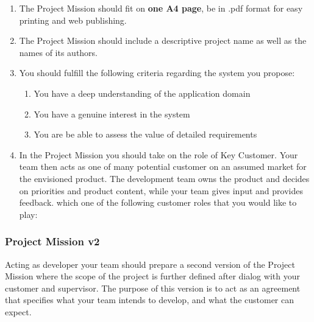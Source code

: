 \documentclass[10pt,a4paper]{article}
\begin{document}
 \begin{enumerate}[noitemsep]
 \item The Project Mission should fit on {\bf one A4 page}, be in .pdf format for easy printing and web publishing. 
 \item The Project Mission should include a descriptive project name as well as the names of its authors.


\item You should fulfill the following criteria regarding the system you propose:
\begin{enumerate}
\item You have a deep understanding of the application domain 
\item You have a genuine interest in the system 
\item You are be able to assess the value of detailed requirements 
\end{enumerate}
\item In the Project Mission you should take on the role of Key Customer. Your team then acts as one of many potential customer on an assumed market for the envisioned product. The development team owns the product and decides on priorities and product content, while your team gives input and provides feedback. which one of the following customer roles that you would like to play:
\end{enumerate}

\subsubsection{Project Mission v2}
Acting as developer your team should prepare a second version of the Project Mission where the scope of the project is further defined after dialog with your customer and supervisor. The purpose of this version is to act as an agreement that specifies what your team intends to develop, and what the customer can expect.
 
\end{document}
